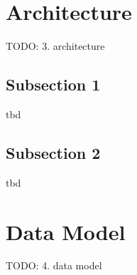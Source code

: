 



\section{Architecture}

TODO:
3. architecture





\subsection{Subsection 1}

tbd



\subsection{Subsection 2}

tbd



\section{Data Model}


TODO:
4. data model




